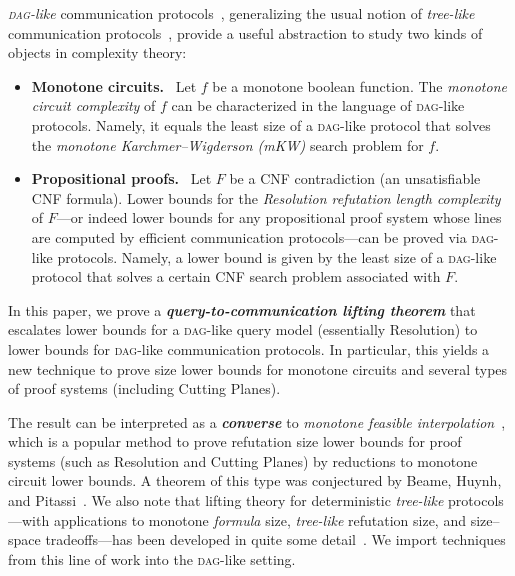 \documentclass{toc}
\newcommand{\DAG}{\textsc{dag}}
\begin{document}
\emph{\DAG-like} communication protocols~\cite{razborov95unprovability,pudlak10extracting,sokolov17dag}, generalizing the usual notion of \emph{tree-like} communication protocols~\cite{kushilevitz97communication,jukna12boolean,rao17communication}, provide a useful abstraction to study two kinds of objects in complexity theory:
\begin{itemize}[label=$\bullet$,itemsep=3mm]
\item {\bf Monotone circuits.}~
Let $f$ be a monotone boolean function. The \emph{monotone circuit complexity} of $f$ can be characterized in the language of \DAG-like protocols. Namely, it equals the least size of a \DAG-like protocol that solves the \emph{monotone Karchmer--Wigderson (mKW)} search problem for $f$.

\item {\bf Propositional proofs.}~
Let $F$ be a CNF contradiction (an unsatisfiable CNF formula). Lower bounds for the \emph{Resolution refutation length complexity} of $F$---or indeed lower bounds for any propositional proof system whose lines are computed by efficient communication protocols---can be proved via \DAG-like protocols. Namely, a lower bound is given by the least size of a \DAG-like protocol that solves a certain CNF search problem associated with $F$.
\end{itemize}

\noindent
In this paper, we prove a {\bf\itshape query-to-communication lifting theorem} that escalates lower bounds for a \DAG-like query model (essentially Resolution) to lower bounds for \DAG-like communication protocols. In particular, this yields a new technique to prove size lower bounds for monotone circuits and several types of proof systems (including Cutting Planes).

\medskip\noindent
The result can be interpreted as a {\bf\itshape converse} to \emph{monotone feasible interpolation}~\cite{bonet97lower,krajicek97interpolation}, which is a popular method to prove refutation size lower bounds for proof systems (such as Resolution and Cutting Planes) by reductions to monotone circuit lower bounds. A theorem of this type was conjectured by Beame, Huynh, and Pitassi~\cite[\S6]{beame10hardness}. We also note that lifting theory for deterministic \emph{tree-like} protocols---with applications to monotone \emph{formula} size, \emph{tree-like} refutation size, and size--space tradeoffs---has been developed in quite some detail~\cite{raz99separation,huynh12virtue,goos14cbs,goos15deterministic,rezende16limited,wu17raz,chattopadhyay17simulation}. We import techniques from this line of work into the \DAG-like setting.
\end{document}
